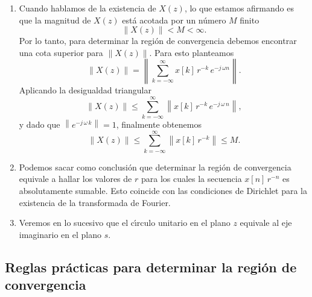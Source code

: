 \begin{enumerate}
  \item Cuando hablamos de la existencia de $X(z)$, lo que estamos afirmando es que la magnitud de 
    $X(z)$ est\'{a} acotada por un n\'{u}mero $M$ finito
    \begin{equation}
      \left\| X(z) \right\| < M < \infty.
    \end{equation}
    Por lo tanto, para determinar la regi\'{o}n de convergencia debemos encontrar una cota superior para 
    $\left\| X(z) \right\|$. Para esto planteamos
    \begin{equation}
      \left\| X(z) \right\| = 
      \left\| \sum_{k=-\infty}^{\infty} x[k] \, r^{-k} \, e^{-j \, \omega n} \right\|.
    \end{equation}
    Aplicando la desigualdad triangular
    \begin{equation}
      \left\| X(z) \right\| \leq
      \sum_{k=-\infty}^{\infty} \left\| x[k] \, r^{-k} \, e^{-j \, \omega \, n} \right\|,
    \end{equation}
    y dado que $\left\| e^{-j \, \omega \, k} \right\| = 1$, finalmente obtenemos
    \begin{equation}
      \left\| X(z) \right\| \leq
            \sum_{k=-\infty}^{\infty} \left\| x[k] \, r^{-k} \right\| \leq M.
    \end{equation}
    
  \item Podemos sacar como conclusi\'{o}n que determinar la regi\'{o}n de convergencia equivale a hallar
    los valores de $r$ para los cuales la secuencia $x[n] \, r^{-n}$ es absolutamente sumable. Esto coincide
    con las condiciones de Dirichlet para la existencia de la transformada de Fourier.

  \item Veremos en lo sucesivo que el c\'{\i}rculo unitario en el plano $z$ equivale al eje imaginario en 
    el plano $s.$

\end{enumerate}

\subsection{Reglas pr\'{a}cticas para determinar la regi\'{o}n de convergencia}


